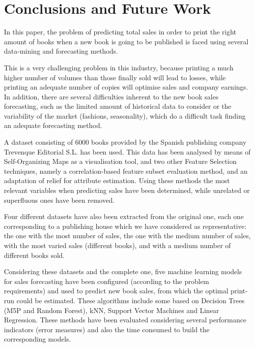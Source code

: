 \documentclass[a4paper,10pt,twocolumn,preprint,3p]{elsarticle}
\begin{document}
\section{Conclusions and Future Work}
\label{sec:conclusionsAndFutureWork}

In this paper, the problem of 
predicting total sales in order to print the right amount of books
when a new book is going to be published is faced using several data-mining 
and forecasting methods.

This is a very challenging problem in this industry, because printing
a much higher 
number of volumes than those finally sold will lead to losses, while
printing an adequate number of copies will optimise sales and company
earnings.  
In addition, there are several difficulties inherent to the new book
sales forecasting, such as the limited amount of historical data to
consider or the variability of the market (fashions, seasonality),
which do a difficult task finding an adequate forecasting method. 

A dataset consisting of 6000 books provided by the Spanish publishing
company Trevenque Editorial S.L. has been used. This data has been
analysed by means of Self-Organizing Maps as a visualisation tool, and
two other Feature Selection techniques, namely a correlation-based
feature subset evaluation method, and an adaptation of relief for
attribute estimation. Using these methods the most relevant variables
when predicting sales have been determined, while unrelated or
superfluous ones have been removed. 

Four different datasets have also been extracted from the original
one, each one corresponding to a publishing house which we have
considered as representative: the one with the most number of sales,
the one with the medium number of sales, with the most varied sales
(different books), and with a medium number of different books sold. 

Considering these datasets and the complete one, five machine learning
models for sales forecasting have been configured (according to the
problem requirements) and used to predict new book sales, from which
the optimal print-run could be estimated. These algorithms include
some based on Decision Trees (M5P and Random Forest), kNN, Support
Vector Machines and Linear Regression. 
These methods have been evaluated considering several performance
indicators (error measures) and also the time consumed to build the
corresponding models. 
\end{document}
